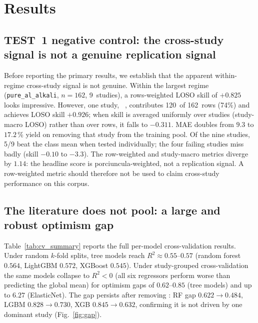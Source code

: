 \section{Results}

\subsection{TEST~1 negative control: the cross-study signal is not a genuine
replication signal}
\label{sec:test1}

Before reporting the primary results, we establish that the apparent within-regime
cross-study signal is not genuine. Within the largest regime (\texttt{pure\_al\_alkali},
$n\!=\!162$, 9~studies), a rows-weighted LOSO skill of $+0.825$ looks impressive.
However, one study, \citeauthor{porciuncula2012}~\cite{porciuncula2012}, contributes
120~of 162~rows (74\%) and achieves LOSO skill $+0.926$; when skill is averaged uniformly
over studies (study-macro LOSO) rather than over rows, it falls to $-0.311$. MAE doubles
from $9.3$ to $17.2$\,\% yield on removing that study from the training pool.
Of the nine studies, 5/9 beat the class mean when tested individually; the four failing
studies miss badly (skill $-0.10$ to $-3.3$). The row-weighted and study-macro metrics
diverge by $1.14$: the headline score is porciuncula-weighted, not a replication signal.
A row-weighted metric should therefore not be used to claim cross-study performance on
this corpus.

\subsection{The literature does not pool: a large and robust optimism gap}

Table~\ref{tab:cv_summary} reports the full per-model cross-validation results. Under
random $k$-fold splits, tree models reach $R^2\!\approx\!0.55$--$0.57$ (random forest
$0.564$, LightGBM $0.572$, XGBoost $0.545$). Under study-grouped cross-validation the
same models collapse to $R^2\!<\!0$ (all six regressors perform worse than predicting
the global mean) for optimism gaps of $0.62$--$0.85$ (tree models) and up to $6.27$
(ElasticNet). The gap persists after removing \citeauthor{porciuncula2012}: RF gap
$0.622\to0.484$, LGBM $0.828\to0.730$, XGB $0.845\to0.632$, confirming it is not driven
by one dominant study (Fig.~\ref{fig:gap}).

